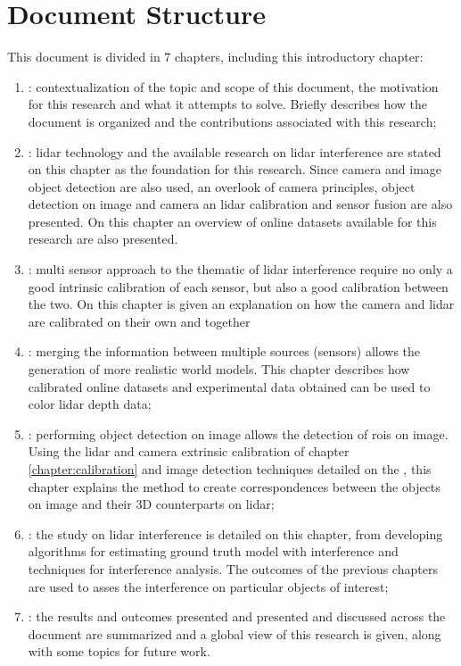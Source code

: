 \section{Document Structure} \label{sec:introduction:structure}
This document is divided in 7 chapters, including this introductory chapter:

\begin{enumerate}[label={\textbf{Chapter \arabic* -}}, align=left, itemindent=\leftmargini]
	\item \textit{}: contextualization of the topic and scope of this document, the motivation for this research and what it attempts to solve. Briefly describes how the document is organized and the contributions associated with this research;
	\item \textit{}: \ac{lidar} technology and the available research on \ac{lidar} interference are stated on this chapter as the foundation for this research. Since camera and image object detection are also used, an overlook of camera principles, object detection on image and camera an \ac{lidar} calibration and sensor fusion are also presented. On this chapter an overview of online datasets available for this research are also presented.
	\item \textit{}: multi sensor approach to the thematic of \ac{lidar} interference require no only a good intrinsic calibration of each sensor, but also a good calibration between the two. On this chapter is given an explanation on how the camera and \ac{lidar} are calibrated on their own and together
	\item \textit{}: merging the information between multiple sources (sensors) allows the generation of more realistic world models. This chapter describes how calibrated online datasets and experimental data obtained can be used to color \ac{lidar} depth data;
	\item \textit{}: performing object detection on image allows the detection of \acp{roi} on image. Using the \ac{lidar} and camera extrinsic calibration  of chapter \ref{chapter:calibration} and image detection techniques detailed on the , this chapter explains the method to create correspondences between the objects on image and their 3D counterparts on \ac{lidar};
	\item \textit{}: the study on \ac{lidar} interference is detailed on this chapter, from developing algorithms for estimating ground truth model with interference and techniques for interference analysis. The outcomes of the previous chapters are used to asses the interference on particular objects of interest;
	\item \textit{}: the results and outcomes presented and presented and  discussed across the document are summarized and a global view of this research is given, along with some topics for future work.
\end{enumerate}

